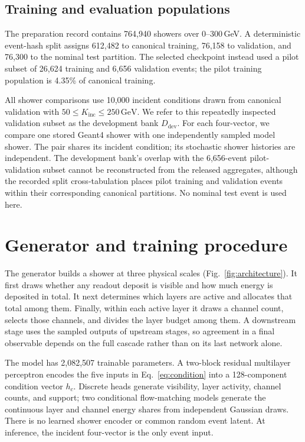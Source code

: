 \documentclass[11pt]{article}
\newcommand{\GeV}{\,\mathrm{GeV}}
\newcommand{\Kinc}{K_{\mathrm{inc}}}
\newcommand{\Ddev}{D_{\mathrm{dev}}}
\begin{document}
\subsection{Training and evaluation populations}

The preparation record contains 764,940 showers over 0--300\,GeV. A deterministic event-hash split assigns 612,482 to canonical training, 76,158 to validation, and 76,300 to the nominal test partition. The selected checkpoint instead used a pilot subset of 26,624 training and 6,656 validation events; the pilot training population is 4.35\% of canonical training.

All shower comparisons use 10,000 incident conditions drawn from canonical validation with $50\leq\Kinc\leq250\GeV$. We refer to this repeatedly inspected validation subset as the development bank $\Ddev$. For each four-vector, we compare one stored Geant4 shower with one independently sampled model shower. The pair shares its incident condition; its stochastic shower histories are independent. The development bank's overlap with the 6,656-event pilot-validation subset cannot be reconstructed from the released aggregates, although the recorded split cross-tabulation places pilot training and validation events within their corresponding canonical partitions. No nominal test event is used here.

\section{Generator and training procedure}
\label{sec:model}

The generator builds a shower at three physical scales (Fig.~\ref{fig:architecture}). It first draws whether any readout deposit is visible and how much energy is deposited in total. It next determines which layers are active and allocates that total among them. Finally, within each active layer it draws a channel count, selects those channels, and divides the layer budget among them. A downstream stage uses the sampled outputs of upstream stages, so agreement in a final observable depends on the full cascade rather than on its last network alone.

The model has 2,082,507 trainable parameters. A two-block residual multilayer perceptron encodes the five inputs in Eq.~\eqref{eq:condition} into a 128-component condition vector $h_c$. Discrete heads generate visibility, layer activity, channel counts, and support; two conditional flow-matching models generate the continuous layer and channel energy shares from independent Gaussian draws. There is no learned shower encoder or common random event latent. At inference, the incident four-vector is the only event input.
\end{document}
